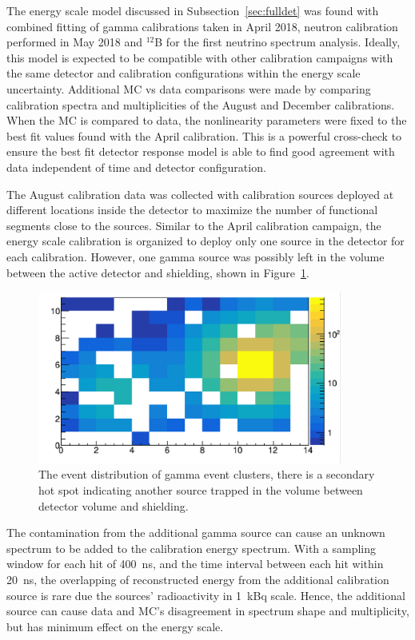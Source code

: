 The energy scale model discussed in Subsection~\ref{sec:fulldet} was found with combined fitting of gamma calibrations taken in April 2018, neutron calibration performed in May 2018 and $^{12}$B for the first  neutrino spectrum analysis. 
Ideally, this model is expected to be compatible with other calibration campaigns with the same detector and calibration configurations within the energy scale uncertainty. 
Additional MC vs data comparisons were made by comparing calibration spectra and multiplicities of the August and December calibrations.
When the MC is compared to data, the nonlinearity parameters were fixed to the best fit values found with the April calibration. 
This is a powerful cross-check to ensure the best fit detector response model is able to find good agreement with data independent of time and detector configuration. 

The August calibration data was collected with calibration sources deployed at different locations inside the detector to maximize the number of functional segments close to the sources.
Similar to the April calibration campaign, the energy scale calibration is organized to deploy only one source in the detector for each calibration.
However, one gamma source was possibly left in the volume between the active detector and shielding, shown in Figure~\ref{fig:left}.
\begin{figure}[h!]
\centering
\includegraphics[width=100mm]{Figures/secondhotspot.png}
\caption[Indication of accidentally left calibration sources]{The event distribution of gamma event clusters, there is a secondary hot spot indicating another source trapped in the volume between detector volume and shielding.}
\label{fig:left}
\end{figure}
The contamination from the additional gamma source can cause an unknown spectrum to be added to the calibration energy spectrum.
With a sampling window for each hit of 400~ns, and the time interval between each hit within 20~ns, the overlapping of reconstructed energy from the additional calibration source is rare due the sources' radioactivity in 1~kBq scale.
Hence, the additional source can cause data and MC's disagreement in spectrum shape and multiplicity, but has minimum effect on the energy scale.

